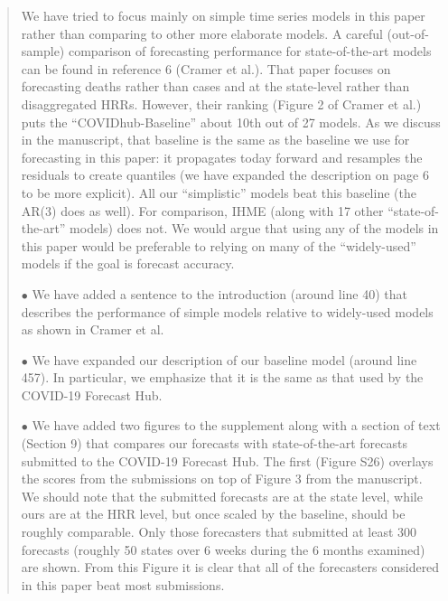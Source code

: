 \documentclass[11pt]{article}
\newenvironment{resp}{\begin{quote}\color{cobalt}}{\end{quote}}
\begin{document}
\begin{resp}
  We have tried to focus mainly on simple time series models in this paper
  rather than comparing to other more elaborate models. A careful
  (out-of-sample) comparison of forecasting performance for state-of-the-art
  models can be found in reference 6 (Cramer et al.). That paper focuses on
  forecasting deaths rather than cases and at the state-level rather than
  disaggregated HRRs. However, their ranking (Figure 2 of Cramer et al.) puts the
  ``COVIDhub-Baseline'' about 10th out of 27 models. As we discuss in the
  manuscript, that baseline is  
  the
  same as the baseline we use for forecasting in this paper: it propagates today
  forward and resamples the residuals to create quantiles (we have expanded the
  description on page 6 to be more explicit). All our ``simplistic'' models beat
  this baseline (the AR(3) does as well). For comparison, IHME (along with 17 other
  ``state-of-the-art'' models) does not. We would argue that using any of the
  models in this paper would be preferable to relying on many of the
  ``widely-used'' models if the goal is forecast accuracy.

  $\bullet$ We have added a sentence to the introduction (around line 40) that
  describes the performance of simple models relative to widely-used models as
  shown in Cramer et al.

  $\bullet$ We have expanded our description of our baseline model (around line
  457). In particular, we emphasize that it is the same as that used by the
  COVID-19 Forecast Hub.

  $\bullet$ We have added two figures to the supplement along with a section of
  text (Section 9) that compares our forecasts with state-of-the-art forecasts
  submitted to the COVID-19 Forecast Hub. The first (Figure S26) overlays the
  scores from the submissions on top of Figure 3 from the manuscript. We should
  note that the submitted forecasts are at the state level, while ours are at
  the HRR level, but once scaled by the baseline, should be roughly comparable.
  Only those forecasters that submitted at least 300 forecasts (roughly 50
  states over 6 weeks during the 6 months examined) are shown. From this Figure
  it is clear that all of the forecasters considered in this paper beat most
  submissions. 
\end{resp}
\end{document}
